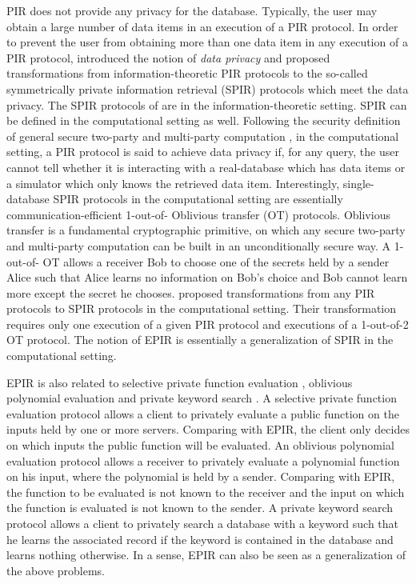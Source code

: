 \documentclass[JMC]{degruyter-journal}
\begin{document}
PIR does not provide any privacy for the database. Typically, the
user may obtain  a large number of data items in an execution of a
PIR protocol. In order to prevent the user from obtaining more than
one data item in any execution of a PIR protocol, \cite{GIKM98}
introduced the notion of {\em data privacy} and proposed
transformations from information-theoretic PIR protocols to  the
so-called symmetrically private information retrieval (SPIR)
 protocols
 which meet the data privacy. The SPIR protocols of \cite{GIKM98} are in the information-theoretic setting.
SPIR can be defined  in the computational setting as well. Following
the security definition of general secure two-party and multi-party
computation \cite{Gol04}, in the computational setting, a PIR
protocol is said to achieve  data privacy if, for any query, the
user cannot tell whether it is interacting with a real-database
which has  data items or a simulator which only knows the
retrieved data item.
 Interestingly, single-database SPIR protocols in  the computational setting  are essentially
 communication-efficient 1-out-of- Oblivious transfer (OT)
 \cite{Rab81,EGL85,BCR87,GMW87,Kil88} protocols.
Oblivious transfer \cite{Rab81} is a fundamental  cryptographic
primitive, on which any secure two-party and multi-party computation
can be built  \cite{Kil88} in an unconditionally secure way. A
1-out-of- OT allows a receiver Bob to choose one of the 
secrets held by a sender Alice such that Alice learns no information
on Bob's choice and Bob cannot learn more except the secret he
chooses. \cite{NP99} proposed transformations from any PIR protocols
to SPIR protocols in the computational setting. Their transformation
requires only one execution of a given PIR protocol and 
executions of a 1-out-of-2 OT protocol. The notion of EPIR
\cite{BCPT07,BC09} is essentially a generalization of SPIR in the
computational setting.

EPIR is also  related to  selective private function evaluation
\cite{CIKRRW01}, oblivious polynomial evaluation  \cite{NP99} and
private keyword search \cite{FIPR05}. A selective private function
evaluation protocol \cite{CIKRRW01} allows a client to privately
evaluate a public function on the inputs  held by one or more
servers. Comparing with EPIR, the client  only decides on which
inputs the public function will be evaluated. An oblivious
polynomial evaluation protocol \cite{NP99} allows a receiver to
privately evaluate  a polynomial function on  his  input, where the
polynomial is held by a sender. Comparing with EPIR, the function to
be evaluated is not known to the receiver and the input on which the
function is evaluated is not known to the sender. A private keyword
search protocol  \cite{FIPR05} allows a client to privately search a
database with a keyword such that he learns the associated record if
the keyword is contained in the database and learns nothing
otherwise. In a sense, EPIR can  also be seen as a generalization of
the above problems.
\end{document}
